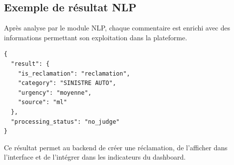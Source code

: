 \documentclass[12pt,a4paper,oneside]{report}
\begin{document}
\subsection{Exemple de résultat NLP}

Après analyse par le module NLP, chaque commentaire est enrichi avec des informations permettant son exploitation dans la plateforme.

\clearpage

\begin{verbatim}
{
  "result": {
    "is_reclamation": "reclamation",
    "category": "SINISTRE AUTO",
    "urgency": "moyenne",
    "source": "ml"
  },
  "processing_status": "no_judge"
}
\end{verbatim}

Ce résultat permet au backend de créer une réclamation, de l'afficher dans l'interface et de l'intégrer dans les indicateurs du dashboard.
\end{document}

